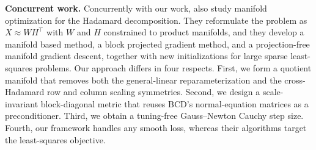 \documentclass[letterpaper, 10 pt, conference]{ieeeconf}
\theoremstyle{plain}
\theoremstyle{definition}
\theoremstyle{remark}
\begin{document}
\noindent\textbf{Concurrent work.} Concurrently with our work, \citet{gillis2026manifold} also study manifold optimization for the Hadamard decomposition. They reformulate the problem as $X \approx WH^\top$ with $W$ and $H$ constrained to product manifolds, and they develop a manifold based method, a block projected gradient method, and a projection-free manifold gradient descent, together with new initializations for large sparse least-squares problems. Our approach differs in four respects. First, we form a quotient manifold that removes both the general-linear reparameterization and the cross-Hadamard row and column scaling symmetries. Second, we design a scale-invariant block-diagonal metric that reuses BCD's normal-equation matrices as a preconditioner. Third, we obtain a tuning-free Gauss--Newton Cauchy step size. Fourth, our framework handles any smooth loss, whereas their algorithms target the least-squares objective. 


\end{document}
